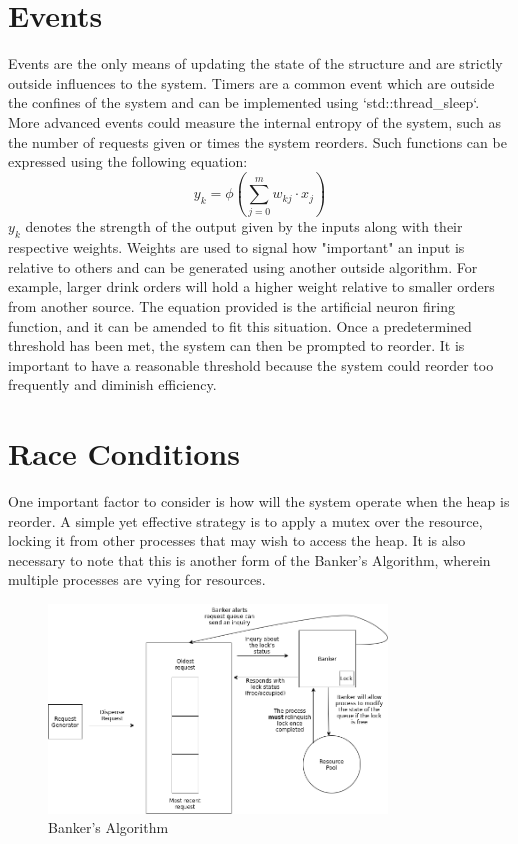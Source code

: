 \documentclass{article}
\begin{document}
\newpage

\section{Events}

Events are the only means of updating the state of the structure and are strictly outside influences to the system.
Timers are a common event which are outside the confines of the system and can be implemented using `std::thread_sleep`.
More advanced events could measure the internal entropy of the system, such as the number of requests given or times the system reorders.
Such functions can be expressed using the following equation:
\[ 
		y_{k} = \phi \left( \sum_{j=0}^{m}w_{kj} \cdot x_{j} \right)
\]
$y_{k}$ denotes the strength of the output given by the inputs along with their respective weights.
Weights are used to signal how "important" an input is relative to others and can be generated using another outside algorithm.
For example, larger drink orders will hold a higher weight relative to smaller orders from another source.
The equation provided is the artificial neuron firing function, and it can be amended to fit this situation.
Once a predetermined threshold has been met, the system can then be prompted to reorder.
It is important to have a reasonable threshold because the system could reorder too frequently and diminish efficiency.

\section{Race Conditions}

\begin{flushleft}

One important factor to consider is how will the system operate when the heap is reorder.
A simple yet effective strategy is to apply a mutex over the resource, locking it from other processes that may wish to access the heap.
It is also necessary to note that this is another form of the Banker's Algorithm, wherein multiple processes are vying for resources.
\end{flushleft}


\begin{figure}[!h]
\centering
\includegraphics[width=9cm]{BankersAlgorithm}
\caption{Banker's Algorithm}
\end{figure}
\end{document}
